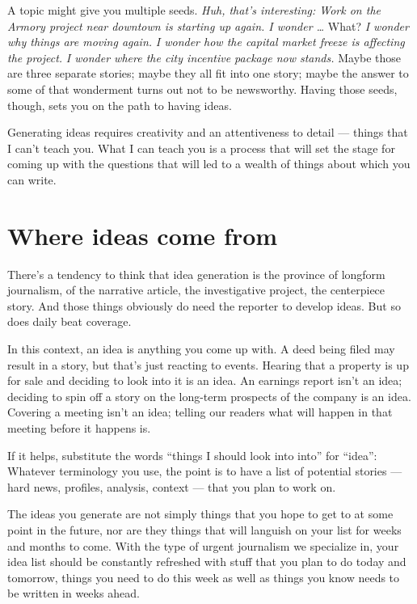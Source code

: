 \documentclass[
  11pt,
  american,
  letterpaperpaper,
  extrafontsizes,onecolumn,openright
  ]{memoir}
\begin{document}
A topic might give you multiple seeds. \emph{Huh, that's interesting: Work on the Armory project near downtown is starting up again. I wonder \ldots{}} What? \emph{I wonder why things are moving again.} \emph{I wonder how the capital market freeze is affecting the project.} \emph{I wonder where the city incentive package now stands.} Maybe those are three separate stories; maybe they all fit into one story; maybe the answer to some of that wonderment turns out not to be newsworthy. Having those seeds, though, sets you on the path to having ideas.

Generating ideas requires creativity and an attentiveness to detail --- things that I can't teach you. What I can teach you is a process that will set the stage for coming up with the questions that will led to a wealth of things about which you can write.

\hypertarget{where-ideas-come-from}{%
\section*{Where ideas come from}\label{where-ideas-come-from}}

There's a tendency to think that idea generation is the province of longform journalism, of the narrative article, the investigative project, the centerpiece story. And those things obviously do need the reporter to develop ideas. But so does daily beat coverage.

In this context, an idea is anything you come up with. A deed being filed may result in a story, but that's just reacting to events. Hearing that a property is up for sale and deciding to look into it is an idea. An earnings report isn't an idea; deciding to spin off a story on the long-term prospects of the company is an idea. Covering a meeting isn't an idea; telling our readers what will happen in that meeting before it happens is.

If it helps, substitute the words \enquote{things I should look into into} for \enquote{idea}: Whatever terminology you use, the point is to have a list of potential stories --- hard news, profiles, analysis, context --- that you plan to work on.

The ideas you generate are not simply things that you hope to get to at some point in the future, nor are they things that will languish on your list for weeks and months to come. With the type of urgent journalism we specialize in, your idea list should be constantly refreshed with stuff that you plan to do today and tomorrow, things you need to do this week as well as things you know needs to be written in weeks ahead.
\end{document}
